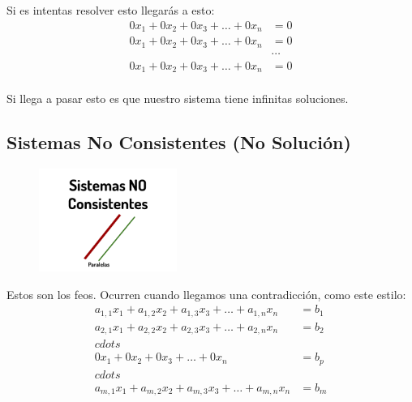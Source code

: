 \documentclass[12pt, fleqn]{report}                             %
\theoremstyle{break}                                            %
\begin{document}
                    Si es intentas resolver esto llegarás a esto:
                    \begin{align*}
                        0x_1   + 0x_2 + 0x_3 + \dots + 0x_n &= 0    \\
                        0x_1   + 0x_2 + 0x_3 + \dots + 0x_n &= 0    \\
                        &\cdots                                     \\
                        0x_1   + 0x_2 + 0x_3 + \dots + 0x_n &= 0    \\
                    \end{align*}

                    Si llega a pasar esto es que nuestro sistema tiene infinitas soluciones.




            \clearpage
            \subsection{Sistemas No Consistentes (No Solución)}

                \begin{figure}[h]
                    \centering
                    \includegraphics[width=0.40\textwidth]{SistemasNoConsistentes}
                \end{figure}

                Estos son los feos.
                Ocurren cuando llegamos una contradicción, como este estilo:
                \begin{align*}
                    a_{1,1}x_1 + a_{1,2}x_2 + a_{1,3}x_3 + \dots + a_{1,n}x_n &= b_1 \\
                    a_{2,1}x_1 + a_{2,2}x_2 + a_{2,3}x_3 + \dots + a_{2,n}x_n &= b_2 \\
                    cdots                                                            \\
                    0x_1       + 0x_2       + 0x_3       + \dots + 0x_n       &= b_p \\
                    cdots                                                            \\
                    a_{m,1}x_1 + a_{m,2}x_2 + a_{m,3}x_3 + \dots + a_{m,n}x_n &= b_m \\
                \end{align*}
\end{document}
